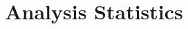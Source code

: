 \documentclass[notitlepage]{article}
\title{Analysis Statistics}
\author{}
\date{}
\begin{document}
\maketitle
\begin{footnotesize}
\begin{center}

\end{center}
\end{footnotesize}
\end{document}
